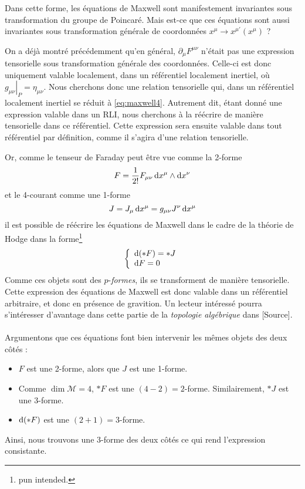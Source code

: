 Dans cette forme, les équations de Maxwell sont manifestement invariantes sous transformation du groupe de Poincaré. Mais est-ce que ces équations sont aussi invariantes sous transformation générale de coordonnées $x^{\mu} \to x^{\mu '}(x^{\mu})$ ?

On a déjà montré précédemment qu'en général, $\partial_{\mu}F^{\mu \nu}$ n'était pas une expression tensorielle sous transformation générale des coordonnées. Celle-ci est donc uniquement valable localement, dans un référentiel localement inertiel, où $\left. g_{\mu \nu}\right|_P = \eta_{\mu \nu}$. Nous cherchons donc une relation tensorielle qui, dans un référentiel localement inertiel se réduit à \ref{eq:maxwell4}. Autrement dit, étant donné une expression valable dans un RLI, nous cherchons à la réécrire de manière tensorielle dans ce référentiel. Cette expression sera ensuite valable dans tout référentiel par définition, comme il s'agira d'une relation tensorielle.

Or, comme le tenseur de Faraday peut être vue comme la 2-forme
\begin{equation}
    F = \frac{1}{2!} F_{\mu\nu} \, \mathrm{d} x^\mu \wedge \mathrm{d} x^\nu
\end{equation}
et le 4-courant comme une 1-forme
\begin{equation}
    J = J_\mu \,\mathrm{d} x^\mu = g_{\mu\nu} J^\nu \,\mathrm{d} x^\mu
\end{equation}
il est possible de réécrire les équations de Maxwell dans le cadre de la théorie de Hodge dans la forme\footnote{pun intended.}
\begin{align}
\label{eq:Maxwell formes}
    \left\{
\begin{array}{l}
\mathrm{d} (*F) = *J\\
\mathrm{d} F = 0
\end{array}
\right.
\end{align}
Comme ces objets sont des $p$-\emph{formes}, ils se transforment de manière tensorielle. Cette expression des équations de Maxwell est donc valable dans un référentiel arbitraire, et donc en présence de gravition. Un lecteur intéressé pourra s'intéresser d'avantage dans cette partie de la \emph{topologie algébrique} dans [Source].\\
\\
Argumentons que ces équations font bien intervenir les mêmes objets des deux côtés : 
\begin{itemize}
    \item $F$ est une 2-forme, alors que $J$ est une 1-forme.
    \item Comme $\dim \mathcal{M} = 4$, $*F$ est une $(4-2) = 2$-forme. Similairement, $*J$ est une 3-forme.
    \item $\mathrm{d} (*F)$ est une $(2+1) = 3$-forme.
\end{itemize}
Ainsi, nous trouvons une 3-forme des deux côtés ce qui rend l'expression consistante.

